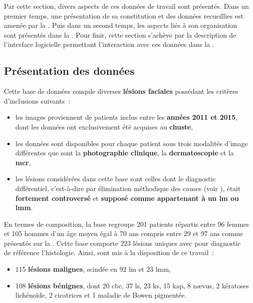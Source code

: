Par cette section, divers aspects de ces données de travail sont présentés. Dans un premier temps, une présentation de sa constitution et des données recueillies est amenée par la . Puis dans un second temps, les aspects liés à son organisation sont présentés dans la . Pour finir, cette section s'achève par la description de l'interface logicielle permettant l'interaction avec ces données dans la .\par

\subsection{Présentation des données}
\label{sec:dataset_introduction}
Cette base de données compile diverses \textbf{lésions faciales} possédant les critères d'inclusions suivants~:
\begin{itemize}
    \item les images proviennent de patients inclus entre les \textbf{années 2011 et 2015}, dont les données ont exclusivement été acquises au \textbf{\gls{chuste}},
    \item les données sont disponibles pour chaque patient sous trois modalités d'image différentes que sont la \textbf{photographie clinique}, la \textbf{dermatoscopie} et la \textbf{\gls{mcr}},
    \item les lésions considérées dans cette base sont celles dont le diagnostic différentiel, c’est-à-dire par élimination méthodique des causes (voir ), était \textbf{fortement controversé} et \textbf{supposé comme appartenant à un \gls{lm} ou \gls{lmm}}.
\end{itemize}\par

En termes de composition, la base regroupe 201 patients répartis entre 96 femmes et 105 hommes d'un âge moyen égal à 70 ans compris entre 29 et 97 ans comme présentés sur la . Cette base comporte 223 lésions uniques avec pour diagnostic de référence l'histologie. Ainsi, sont mis à la disposition de ce travail~:
\begin{itemize}
    \item 115 \textbf{lésions malignes}, scindée en 92 \gls{lm} et 23 \gls{lmm},
    \item 108 \textbf{lésions bénignes}, dont 20 \gls{cbc}, 37 \gls{ls}, 23 \gls{ks}, 15 \gls{kap}, 8 nævus, 2 kératoses lichénoïde, 2 cicatrices et 1 maladie de Bowen pigmentée.
\end{itemize}\par

